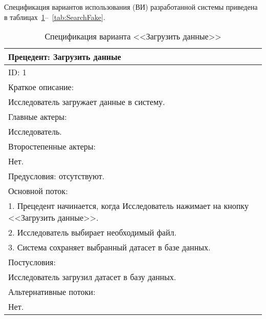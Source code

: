 \newpage
{}


Спецификация вариантов использования (ВИ) разработанной системы приведена в таблицах~\ref{tab:UploadingData}--~\ref{tab:SearchFake}.


\begin{table}[H]
    \caption{Спецификация варианта <<Загрузить данные>>}
    \vspace{1em}
    \small
    \begin{tabular}{|p{15cm}|}
       \hline
        Прецедент: Загрузить данные\\ \hline
        ID: 1\\ \hline
        Краткое описание: \\ Исследователь загружает данные в систему.\\ \hline
        Главные актеры: \\ Исследователь.\\ \hline
        Второстепенные актеры: \\ Нет.\\ \hline
        Предусловия: отсутствуют.\\ \hline
        Основной поток:\\
        1. Прецедент начинается, когда Исследователь нажимает на кнопку <<Загрузить данные>>.\\
        2. Исследователь выбирает необходимый файл.\\
        3. Система сохраняет выбранный датасет в базе данных.
        \\ \hline
        Постусловия:\\ Исследователь загрузил датасет в базу данных. \\ \hline
        Альтернативные потоки:\\ Нет. \\ \hline
    \end{tabular}
    \label{tab:UploadingData}
\end{table}



